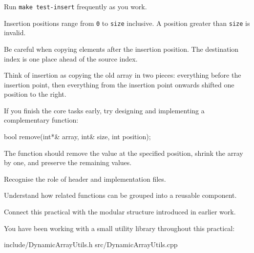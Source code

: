 \documentclass{csc2059practical}
\begin{document}
Run \texttt{make test-insert} frequently as you work.

\begin{commonerror}
Insertion positions range from \texttt{0} to \texttt{size} inclusive. A position greater than \texttt{size} is invalid.
\end{commonerror}

\begin{commonerror}
Be careful when copying elements after the insertion position. The destination index is one place ahead of the source index.
\end{commonerror}

\begin{tipbox}
Think of insertion as copying the old array in two pieces: everything before the insertion point, then everything from the insertion point onwards shifted one position to the right.
\end{tipbox}

\begin{challengebox}
If you finish the core tasks early, try designing and implementing a complementary function:

\begin{cppcode}
bool remove(int*& array,
            int& size,
            int position);
\end{cppcode}

The function should remove the value at the specified position, shrink the array by one, and preserve the remaining values.
\end{challengebox}


\begin{exerciseobjectives}
  \item Recognise the role of header and implementation files.
  \item Understand how related functions can be grouped into a reusable component.
  \item Connect this practical with the modular structure introduced in earlier work.
\end{exerciseobjectives}

You have been working with a small utility library throughout this practical:

\begin{terminal}
include/DynamicArrayUtils.h
src/DynamicArrayUtils.cpp
\end{terminal}
\end{document}
